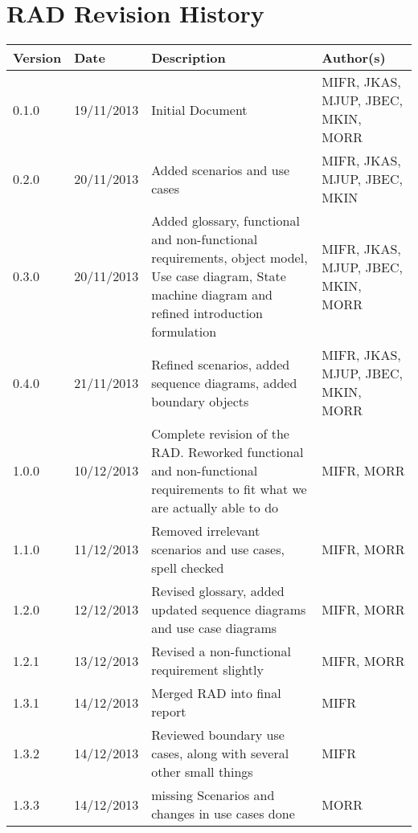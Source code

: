 \section{RAD Revision History}
\begin{center}
    \begin{tabular}{ | l | l | p{6cm} | p{4cm} |}
    \hline
    Version & Date & Description & Author(s) \\ \hline
    0.1.0 & 19/11/2013 & Initial Document & MIFR, JKAS, MJUP, JBEC, MKIN, MORR
    \\ \hline
    0.2.0 & 20/11/2013 & Added scenarios and use cases & MIFR, JKAS, MJUP, JBEC, MKIN
    \\ \hline
    0.3.0 & 20/11/2013 & Added glossary, functional and non-functional requirements, object model, Use case diagram, State machine diagram and refined introduction formulation & MIFR, JKAS, MJUP, JBEC, MKIN, MORR
    \\ \hline
    0.4.0 & 21/11/2013 & Refined scenarios, added sequence diagrams, added boundary objects & MIFR, JKAS, MJUP, JBEC, MKIN, MORR
    \\ \hline
    1.0.0 & 10/12/2013 & Complete revision of the RAD. Reworked functional and non-functional requirements to fit what we are actually able to do & MIFR, MORR
    \\ \hline
    1.1.0 & 11/12/2013 & Removed irrelevant scenarios and use cases, spell checked & MIFR, MORR
    \\ \hline
    1.2.0 & 12/12/2013 & Revised glossary, added updated sequence diagrams and use case diagrams & MIFR, MORR
    \\ \hline
    1.2.1 & 13/12/2013 & Revised a non-functional requirement slightly & MIFR, MORR
    \\ \hline
    1.3.1 & 14/12/2013 & Merged RAD into final report & MIFR
    \\ \hline
    1.3.2 & 14/12/2013 & Reviewed boundary use cases, along with several other small things & MIFR
    \\ \hline
    1.3.3 & 14/12/2013 & missing Scenarios and changes in use cases done & MORR
    \\ \hline
    \end{tabular}
\end{center}

